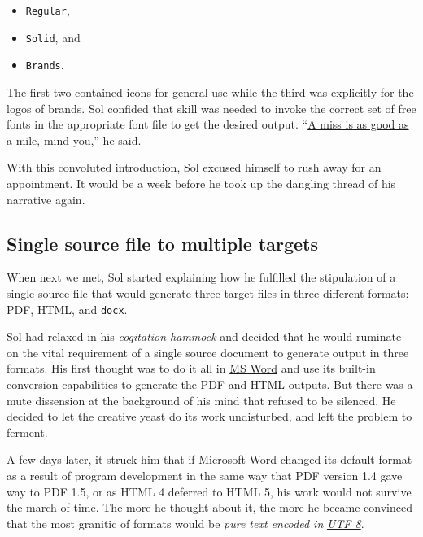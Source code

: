 \documentclass[
  british,
  a4paper,
  rgb,
  dvipsnames,
  svgnames,
  hyphens]{article}
\providecommand{\tightlist}{%
  \setlength{\itemsep}{0pt}\setlength{\parskip}{0pt}}
\begin{document}
\begin{itemize}
\tightlist
\item
  \texttt{Regular},
\item
  \texttt{Solid}, and
\item
  \texttt{Brands}.
\end{itemize}

The first two contained icons for general use while the third was
explicitly for the logos of brands. Sol confided that skill was needed
to invoke the correct set of free fonts in the appropriate font file to
get the desired output.
``\href{https://idioms.thefreedictionary.com/a+miss+is+as+good+as+a+mile}{A
miss is as good as a mile, mind you},'' he said.

With this convoluted introduction, Sol excused himself to rush away for
an appointment. It would be a week before he took up the dangling thread
of his narrative again.

\hypertarget{single-source-file-to-multiple-targets}{%
\subsection{Single source file to multiple
targets}\label{single-source-file-to-multiple-targets}}

When next we met, Sol started explaining how he fulfilled the
stipulation of a single source file that would generate three target
files in three different formats: PDF, HTML, and \texttt{docx}.

Sol had relaxed in his \emph{cogitation hammock} and decided that he
would ruminate on the vital requirement of a single source document to
generate output in three formats. His first thought was to do it all in
\href{https://www.microsoft.com/en-in/microsoft-365/word}{MS Word} and
use its built-in conversion capabilities to generate the PDF and HTML
outputs. But there was a mute dissension at the background of his mind
that refused to be silenced. He decided to let the creative yeast do its
work undisturbed, and left the problem to ferment.

A few days later, it struck him that if Microsoft Word changed its
default format as a result of program development in the same way that
PDF version 1.4 gave way to PDF 1.5, or as HTML 4 deferred to HTML 5,
his work would not survive the march of time. The more he thought about
it, the more he became convinced that the most granitic of formats would
be \emph{pure text encoded in}
\href{https://en.wikipedia.org/wiki/UTF-8}{\emph{UTF 8}}.
\end{document}

